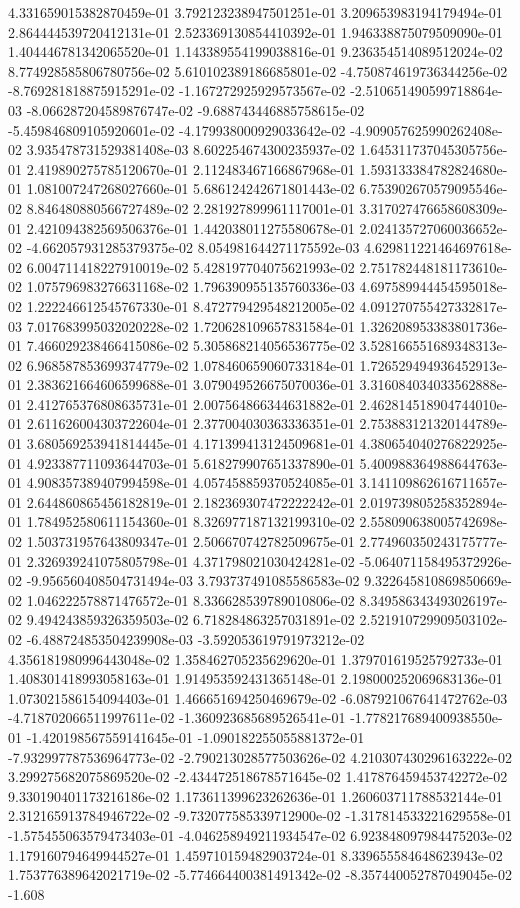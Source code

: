 	4.331659015382870459e-01	3.792123238947501251e-01	3.209653983194179494e-01	2.864444539720412131e-01	2.523369130854410392e-01	1.946338875079509090e-01	1.404446781342065520e-01	1.143389554199038816e-01	9.236354514089512024e-02	8.774928585806780756e-02	5.610102389186685801e-02	-4.750874619736344256e-02	-8.769281818875915291e-02	-1.167272925929573567e-02	-2.510651490599718864e-03	-8.066287204589876747e-02	-9.688743446885758615e-02	-5.459846809105920601e-02	-4.179938000929033642e-02	-4.909057625990262408e-02	3.935478731529381408e-03	8.602254674300235937e-02	1.645311737045305756e-01	2.419890275785120670e-01	2.112483467166867968e-01	1.593133384782824680e-01	1.081007247268027660e-01	5.686124242671801443e-02	6.753902670579095546e-02	8.846480880566727489e-02	2.281927899961117001e-01	3.317027476658608309e-01	2.421094382569506376e-01	1.442038011275580678e-01	2.024135727060036652e-02	-4.662057931285379375e-02	8.054981644271175592e-03	4.629811221464697618e-02	6.004711418227910019e-02	5.428197704075621993e-02	2.751782448181173610e-02	1.075796983276631168e-02	1.796390955135760336e-03	4.697589944454595018e-02	1.222246612545767330e-01	8.472779429548212005e-02	4.091270755427332817e-03	7.017683995032020228e-02	1.720628109657831584e-01	1.326208953383801736e-01	7.466029238466415086e-02	5.305868214056536775e-02	3.528166551689348313e-02	6.968587853699374779e-02	1.078460659060733184e-01	1.726529494936452913e-01	2.383621664606599688e-01	3.079049526675070036e-01	3.316084034033562888e-01	2.412765376808635731e-01	2.007564866344631882e-01	2.462814518904744010e-01	2.611626004303722604e-01	2.377004030363336351e-01	2.753883121320144789e-01	3.680569253941814445e-01	4.171399413124509681e-01	4.380654040276822925e-01	4.923387711093644703e-01	5.618279907651337890e-01	5.400988364988644763e-01	4.908357389407994598e-01	4.057458859370524085e-01	3.141109862616711657e-01	2.644860865456182819e-01	2.182369307472222242e-01	2.019739805258352894e-01	1.784952580611154360e-01	8.326977187132199310e-02	2.558090638005742698e-02	1.503731957643809347e-01	2.506670742782509675e-01	2.774960350243175777e-01	2.326939241075805798e-01	4.371798021030424281e-02	-5.064071158495372926e-02	-9.956560408504731494e-03	3.793737491085586583e-02	9.322645810869850669e-02	1.046222578871476572e-01	8.336628539789010806e-02	8.349586343493026197e-02	9.494243859326359503e-02	6.718284863257031891e-02	2.521910729909503102e-02	-6.488724853504239908e-03	-3.592053619791973212e-02	4.356181980996443048e-02	1.358462705235629620e-01	1.379701619525792733e-01	1.408301418993058163e-01	1.914953592431365148e-01	2.198000252069683136e-01	1.073021586154094403e-01	1.466651694250469679e-02	-6.087921067641472762e-03	-4.718702066511997611e-02	-1.360923685689526541e-01	-1.778217689400938550e-01	-1.420198567559141645e-01	-1.090182255055881372e-01	-7.932997787536964773e-02	-2.790213028577503626e-02	4.210307430296163222e-02	3.299275682075869520e-02	-2.434472518678571645e-02	1.417876459453742272e-02	9.330190401173216186e-02	1.173611399623262636e-01	1.260603711788532144e-01	2.312165913784946722e-02	-9.732077585339712900e-02	-1.317814533221629558e-01	-1.575455063579473403e-01	-4.046258949211934547e-02	6.923848097984475203e-02	1.179160794649944527e-01	1.459710159482903724e-01	8.339655584648623943e-02	1.753776389642021719e-02	-5.774664400381491342e-02	-8.357440052787049045e-02	-1.608